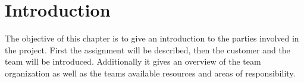 \chapter{Introduction}
The objective of this chapter is to give an introduction to the parties involved in the project. First the assignment will be described, then the customer and the team will be introduced.
Additionally it gives an overview of the team organization as well as the teams available resources and areas of responsibility.






